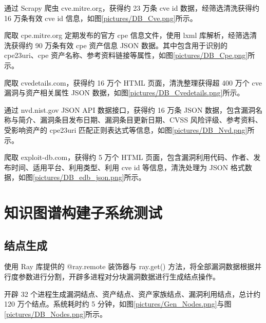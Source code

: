 \documentclass[a4paper,AutoFakeBold,oneside,12pt]{book}
\begin{document}
通过 Scrapy 爬虫 cve.mitre.org，获得约 23 万条 cve id 数据，经筛选清洗获得约 16 万条有效 cve id 信息，如图\ref{pictures/DB_Cve.png}所示。


爬取 cpe.mitre.org 定期发布的官方 cpe 信息文件，使用 lxml 库解析，经筛选清洗获得约 90 万条有效 cpe 资产信息 JSON 数据。其中包含用于识别的 cpe23uri、cpe 资产名称、参考资料链接等属性，如图\ref{pictures/DB_Cpe.png}所示。


爬取 cvedetails.com，获得约 16 万个 HTML 页面，清洗整理获得超 400 万个 cve 漏洞与资产相关属性 JSON 数据，如图\ref{pictures/DB_Cvedetails.png}所示。


通过 nvd.nist.gov JSON API 数据接口，获得约 16 万条 JSON 数据，包含漏洞名称与简介、漏洞条目发布日期、漏洞条目更新日期、CVSS 风险评级、参考资料、受影响资产的 cpe23uri 匹配正则表达式等信息，如图\ref{pictures/DB_Nvd.png}所示。


爬取 exploit-db.com，获得约 5 万个 HTML 页面，包含漏洞利用代码、作者、发布时间、适用平台、利用类型、利用 cve id 等信息，清洗处理为 JSON 格式数据，如图\ref{pictures/DB_edb_json.png}所示。


\section{知识图谱构建子系统测试}

\subsection{结点生成}

使用 Ray 库提供的 @ray.remote 装饰器与 ray.get() 方法，将全部漏洞数据根据并行度参数进行分割，开辟多进程对分块漏洞数据进行生成结点操作。

开辟 32 个进程生成漏洞结点、资产结点、资产家族结点、漏洞利用结点，总计约 120 万个结点。系统耗时约 5 分钟，如图\ref{pictures/Gen_Nodes.png}与图\ref{pictures/DB_Nodes.png}所示。
\end{document}
